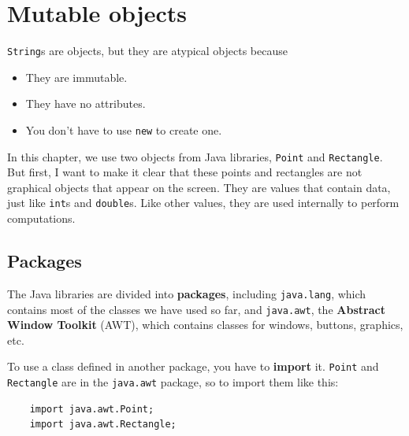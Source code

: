 \documentclass[12pt]{book}
\theoremstyle{exercise}
\begin{document}
\chapter{Mutable objects}
\label{chap08}
\label{objects}



{\tt String}s are objects, but they are atypical objects
because

\begin{itemize}

\item They are immutable.

\item They have no attributes.

\item You don't have to use {\tt new} to create one.

\end{itemize}

In this chapter, we use two objects from Java libraries,
 {\tt Point} and {\tt Rectangle}.
But first, I want to make it clear that these points
and rectangles are not graphical objects that appear on the
screen.  They are values that contain data, just like {\tt int}s
and {\tt double}s.  Like other values, they are used internally
to perform computations.


\section{Packages}

The Java libraries are divided into {\bf
packages}, including {\tt java.lang}, which contains most of the
classes we have used so far, and {\tt java.awt},
the {\bf Abstract Window Toolkit} (AWT),
which contains classes for windows, buttons, graphics, etc.

To use a class defined in another package, you have to {\bf
  import} it.  {\tt Point} and {\tt Rectangle} are in the
{\tt java.awt} package, so to import them like this:

\begin{lstlisting}
    import java.awt.Point;
    import java.awt.Rectangle;
\end{lstlisting}
\end{document}
